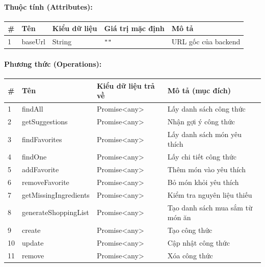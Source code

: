 \documentclass[12pt,a4paper]{article}
\begin{document}
\paragraph{Thuộc tính (Attributes):}
\begin{longtable}{|p{0.6cm}|p{2.8cm}|p{2.2cm}|p{1.8cm}|p{5.8cm}|}
\hline
\textbf{\#} & \textbf{Tên} & \textbf{Kiểu dữ liệu} & \textbf{Giá trị mặc định} & \textbf{Mô tả} \\ \hline
\endhead
1 & baseUrl & String & \texttt{""} & URL gốc của backend \\ \hline
\end{longtable}

\paragraph{Phương thức (Operations):}
\begin{longtable}{|p{0.6cm}|p{3.8cm}|p{2.6cm}|p{6.5cm}|}
\hline
\textbf{\#} & \textbf{Tên} & \textbf{Kiểu dữ liệu trả về} & \textbf{Mô tả (mục đích)} \\ \hline
\endhead
1 & findAll & Promise\textless{}any\textgreater{} & Lấy danh sách công thức \\ \hline
2 & getSuggestions & Promise\textless{}any\textgreater{} & Nhận gợi ý công thức \\ \hline
3 & findFavorites & Promise\textless{}any\textgreater{} & Lấy danh sách món yêu thích \\ \hline
4 & findOne & Promise\textless{}any\textgreater{} & Lấy chi tiết công thức \\ \hline
5 & addFavorite & Promise\textless{}any\textgreater{} & Thêm món vào yêu thích \\ \hline
6 & removeFavorite & Promise\textless{}any\textgreater{} & Bỏ món khỏi yêu thích \\ \hline
7 & getMissingIngredients & Promise\textless{}any\textgreater{} & Kiểm tra nguyên liệu thiếu \\ \hline
8 & generateShoppingList & Promise\textless{}any\textgreater{} & Tạo danh sách mua sắm từ món ăn \\ \hline
9 & create & Promise\textless{}any\textgreater{} & Tạo công thức \\ \hline
10 & update & Promise\textless{}any\textgreater{} & Cập nhật công thức \\ \hline
11 & remove & Promise\textless{}any\textgreater{} & Xóa công thức \\ \hline
\end{longtable}
\end{document}
